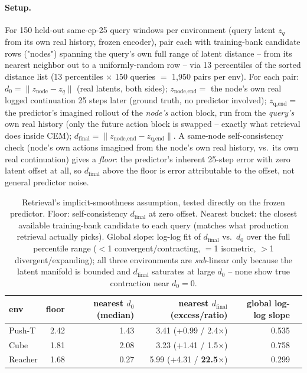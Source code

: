 \documentclass[11pt]{article}
\begin{document}
\paragraph{Setup.} For 150 held-out same-ep-25 query windows per environment (query latent
$z_q$ from its own real history, frozen encoder), pair each with training-bank candidate rows
("nodes") spanning the query's own full range of latent distance -- from its nearest neighbor
out to a uniformly-random row -- via 13 percentiles of the sorted distance list (13
percentiles $\times$ 150 queries $=$ 1{,}950 pairs per env). For each pair: $d_0 = \lVert
z_{\text{node}} - z_q\rVert$ (real latents, both sides); $z_{\text{node,end}} =$ the node's own
real logged continuation 25 steps later (ground truth, no predictor involved); $z_{\text{q,end}}
=$ the predictor's imagined rollout of the \emph{node's} action block, run from the
\emph{query's} own real history (only the future action block is swapped -- exactly what
retrieval does inside CEM); $d_{\text{final}} = \lVert z_{\text{node,end}} - z_{\text{q,end}}
\rVert$. A same-node self-consistency check (node's own actions imagined from the node's own
real history, vs.\ its own real continuation) gives a \emph{floor}: the predictor's inherent
25-step error with zero latent offset at all, so $d_{\text{final}}$ above the floor is error
attributable to the offset, not general predictor noise.

\begin{table}[H]
\centering\small
\caption{Retrieval's implicit-smoothness assumption, tested directly on the frozen predictor.
Floor: self-consistency $d_{\text{final}}$ at zero offset. Nearest bucket: the closest available
training-bank candidate to each query (matches what production retrieval actually picks).
Global slope: log-log fit of $d_{\text{final}}$ vs.\ $d_0$ over the full percentile range ($<$1
convergent/contracting, $=$1 isometric, $>$1 divergent/expanding); all three environments are
\emph{sub}-linear only because the latent manifold is bounded and $d_{\text{final}}$ saturates
at large $d_0$ -- none show true contraction near $d_0{=}0$.}
\label{tab:retrieval-sensitivity}
\begin{tabular}{lrrrrr}
\toprule
env & floor & nearest $d_0$ (median) & nearest $d_{\text{final}}$ (excess/ratio) & global log-log slope \\
\midrule
Push-T   & 2.42 & 1.43 & 3.41 (+0.99 / 2.4$\times$)  & 0.535 \\
Cube     & 1.81 & 2.08 & 3.23 (+1.41 / 1.5$\times$)  & 0.758 \\
Reacher  & 1.68 & 0.27 & 5.99 (+4.31 / \textbf{22.5$\times$})  & 0.299 \\
\bottomrule
\end{tabular}
\end{table}
\end{document}
